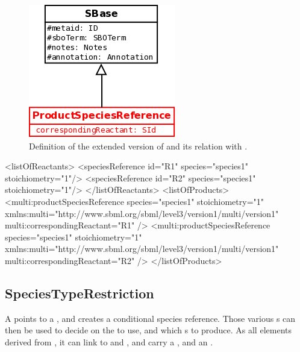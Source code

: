 \begin{figure}[H]
\begin{center}
\includegraphics[scale=0.3]{figs/pngs/ProductSpeciesReferenceClass.png} 
\caption{Definition of the extended version of  and its relation with .}
\label{fig:ProductSpeciesReferenceClass}
\end{center}
\end{figure}

\begin{example}
<listOfReactants>
  <speciesReference id="R1" species="species1" stoichiometry="1"/>
  <speciesReference id="R2" species="species1" stoichiometry="1"/>
</listOfReactants>
<listOfProducts>
  <multi:productSpeciesReference species="species1" stoichiometry="1"
                xmlns:multi="http://www.sbml.org/sbml/level3/version1/multi/version1"
                multi:correspondingReactant="R1" />
  <multi:productSpeciesReference species="species1" stoichiometry="1"
                xmlns:multi="http://www.sbml.org/sbml/level3/version1/multi/version1"
                multi:correspondingReactant="R2" />
</listOfProducts>
\end{example}

\subsection{SpeciesTypeRestriction}

A  points to a , and creates a conditional species reference. Those various s can then be used to decide on the  to use, and which s to produce. As all elements derived from , it can link to  and , and carry a , and an .

